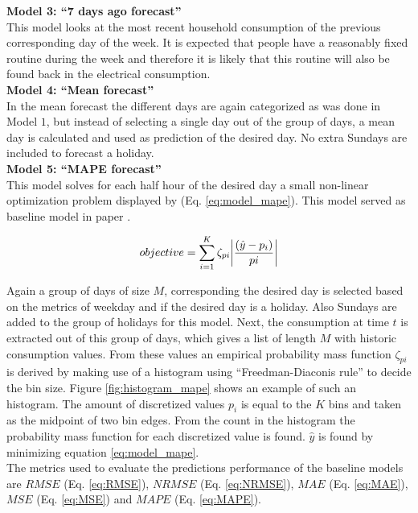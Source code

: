  \textbf{Model 3: ``7 days ago forecast''}\\
 This model looks at the most recent household consumption of the previous corresponding day of the week. It is expected that people have a reasonably fixed routine during the week and therefore it is likely that this routine will also be found back in the electrical consumption.\\
 
 \textbf{Model 4: ``Mean forecast''}\\
 In the mean forecast the different days are again categorized as was done in Model $ 1 $, but instead of selecting a single day out of the group of days, a mean day is calculated and used as prediction of the desired day. No extra Sundays are included to forecast a holiday.\\
 
 \textbf{Model 5: ``MAPE forecast'' }\\
 This model solves for each half hour of the desired day a small non-linear optimization problem displayed by (Eq. \ref{eq:model_mape}). This model served as baseline model in paper \cite{Kong2019}. 
 
 \begin{equation}\label{eq:model_mape}
 	objective = \sum_{i=1}^K \zeta_{pi}\abs{\frac{(\hat{y}-p_i)}{pi}}
 \end{equation}
 
 Again a group of days of size $ M $, corresponding the desired day is selected based on the metrics of weekday and if the desired day is a holiday. Also Sundays are added to the group of holidays for this model. Next, the consumption at time $ t $ is extracted out of this group of days, which gives a list of length $ M $ with historic consumption values. From these values an empirical probability mass function $ \zeta_{pi} $ is derived by making use of a histogram using ``Freedman-Diaconis rule'' to decide the bin size. Figure \ref{fig:histogram_mape} shows an example of such an histogram. The amount of discretized values $ p_i $ is equal to the $ K $ bins and taken as the midpoint of two bin edges. From the count in the histogram the probability mass function for each discretized value is found. $ \hat{y} $ is found by minimizing equation \ref{eq:model_mape}.\\
 
The metrics used to evaluate the predictions performance of the baseline models are $ RMSE $ (Eq. \ref{eq:RMSE}), $ NRMSE $ (Eq. \ref{eq:NRMSE}), $ MAE $ (Eq. \ref{eq:MAE}), $ MSE $ (Eq. \ref{eq:MSE}) and $ MAPE $ (Eq. \ref{eq:MAPE}).

